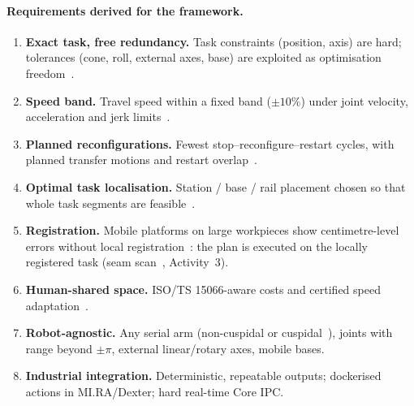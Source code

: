 \documentclass[10pt,a4paper]{article}
\begin{document}
\paragraph{Requirements derived for the framework.}
\begin{enumerate}[label=R\arabic*.]
\item \textbf{Exact task, free redundancy.} Task constraints (position, axis) are hard; tolerances (cone, roll, external axes, base) are exploited as optimisation freedom~\cite{demaeyer2017descartes,chen2025cooptimization}.
\item \textbf{Speed band.} Travel speed within a fixed band ($\pm10\%$) under joint velocity, acceleration and jerk limits~\cite{lange2016pathaccurate}.
\item \textbf{Planned reconfigurations.} Fewest stop--reconfigure--restart cycles, with planned transfer motions and restart overlap~\cite{yin2024dpbreakpoints,wang2025anytimetracking}.
\item \textbf{Optimal task localisation.} Station / base / rail placement chosen so that whole task segments are feasible~\cite{weingartshofer2021tcpbase,wachter2024tcpbase}.
\item \textbf{Registration.} Mobile platforms on large workpieces show centimetre-level errors without local registration~\cite{zhao2021mobilemachining}: the plan is executed on the locally registered task (seam scan~\cite{wang2026torchposture}, Activity~3).
\item \textbf{Human-shared space.} ISO/TS 15066-aware costs and certified speed adaptation~\cite{faroni2022safetyaware,gursoy2026cosmik}.
\item \textbf{Robot-agnostic.} Any serial arm (non-cuspidal or cuspidal~\cite{elias2025cuspidal}), joints with range beyond $\pm\pi$, external linear/rotary axes, mobile bases.
\item \textbf{Industrial integration.} Deterministic, repeatable outputs; dockerised actions in MI.RA/Dexter; hard real-time Core IPC.
\end{enumerate}

\end{document}
